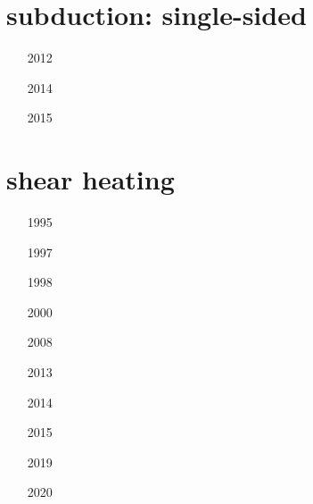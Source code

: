\section{subduction: single-sided}

\begin{small}
\begin{itemize}
\item[2012]
\item[2014]
\item[2015]
\end{itemize}
\end{small}





\section{shear heating}

\begin{small}
\begin{itemize}
\item[1995] 
\item[1997] 
\item[1998] 
\item[2000] 
\item[2008] \\ 
\item[2013] \\ 
\item[2014] 
\item[2015] 
\item[2019] 
\item[2020] 
\end{itemize}
\end{small}


